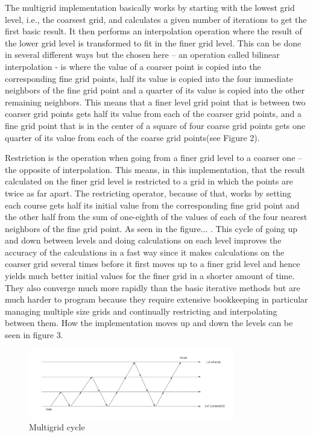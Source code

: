 \documentclass{article}
\begin{document}
The multigrid implementation basically works by starting with the lowest grid level, i.e., the coarsest grid, and calculates a given number of iterations to get the first basic result. It then performs an interpolation operation where the result of the lower grid level is transformed to fit in the finer grid level. This can be done in several different ways but the chosen here – an operation called bilinear interpolation - is where the value of a coarser point is copied into the corresponding fine grid points, half its value is copied into the four immediate neighbors of the fine grid point and a quarter of its value is copied into the other remaining neighbors. This means that a finer level grid point that is between two coarser grid points gets half its value from each of the coarser grid points, and a fine grid point that is in the center of a square of four coarse grid points gets one quarter of its value from each of the coarse grid points(see Figure 2).

Restriction is the operation when going from a finer grid level to a coarser one – the opposite of interpolation. This means, in this implementation, that the result calculated on the finer grid level is restricted to a grid in which the points are twice as far apart. The restricting operator, because of that, works by setting each course gets half its initial value from the corresponding fine grid point and the other half from the sum of one-eighth of the values of each of the four nearest neighbors of the fine grid point. As seen in the figure... . This cycle of going up and down between levels and doing calculations on each level improves the accuracy of the calculations in a fast way since it makes calculations on the coarser grid several times before it first moves up to a finer grid level and hence yields much better initial values for the finer grid in a shorter amount of time. They also converge much more rapidly than the basic iterative methods but are much harder to program because they require extensive bookkeeping in particular managing multiple size grids and continually restricting and interpolating between them. How the implementation moves up and down the levels can be seen in figure 3.

\begin{figure}[h!]
    \centering
    \includegraphics[width=0.8\textwidth]{../images/multigridpattern.png}
    \caption{Multigrid cycle}
    \label{fig:basic}
\end{figure}
 \newpage
 
\end{document}
